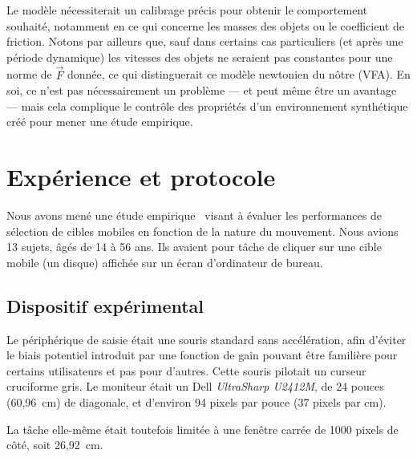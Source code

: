     
    Le modèle nécessiterait un calibrage précis pour obtenir le comportement souhaité, notamment en ce qui concerne les masses des objets ou le coefficient de friction. Notons par ailleurs que, sauf dans certains cas particuliers (et après une période dynamique) les vitesses des objets ne seraient pas constantes pour une norme de $\vec{F}$ donnée, ce qui distinguerait ce modèle newtonien du nôtre (VFA). En soi, ce n'est pas nécessairement un problème --- et peut même être un avantage --- mais cela complique le contrôle des propriétés d'un environnement synthétique créé pour mener une étude empirique.

\section{Expérience et protocole}
	Nous avons mené une étude empirique~\cite{kouyoumdjian2015characterizing} visant à évaluer les performances de sélection de cibles mobiles en fonction de la nature du mouvement. Nous avions 13 sujets, âgés de 14 à 56 ans. Ils avaient pour tâche de cliquer sur une cible mobile (un disque) affichée sur un écran d'ordinateur de bureau.

	\subsection{Dispositif expérimental}
	Le périphérique de saisie était une souris standard sans accélération, afin d'éviter le biais potentiel introduit par une fonction de gain pouvant être familière pour certains utilisateurs et pas pour d'autres. Cette souris pilotait un curseur cruciforme gris. Le moniteur était un Dell \emph{UltraSharp U2412M}\footnotemark{}, de 24 pouces (60,96~cm) de diagonale, et d'environ 94 pixels par pouce (37 pixels par cm).
	
	La tâche elle-même était toutefois limitée à une fenêtre carrée de 1000 pixels de côté, soit 26,92~cm.


